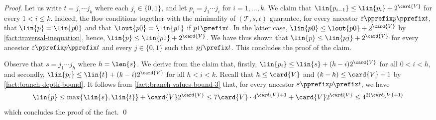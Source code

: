 \FactBranchValuesBoundFour*
\begin{proof}
  Let us write $t = j_1 \cdots j_k$ where each $j_i \in \{0, 1\}$,
  and let $p_i = j_1 \cdots j_i$ for $i = 1, \ldots, k$.
  We claim that
  $\lin{p_{i-1}} \leq \lin{p_i} + 2^{\card{V}}$
  for every $1 < i \leq k$.
  Indeed,
  the flow conditions together with
  the minimality of $(\mathcal{T}, s, t)$ guarantee,
  for every ancestor $\varepsilon \pprefix p \pprefix t$,
  that $\lin{p} = \lin{p0}$ and
  that $\lout{p0} = \lin{p1}$ if $p1 \prefix t$.
  In the latter case,
  $\lin{p0} \leq \lout{p0} + 2^{\card{V}}$
  by \cref{fact:traversal-inequation},
  hence,
  $\lin{p} \leq \lin{p1} + 2^{\card{V}}$.
  We have thus shown that
  $\lin{p} \leq \lin{pj} + 2^{\card{V}}$
  for every ancestor $\varepsilon \pprefix p \pprefix t$
  and every $j \in \{0, 1\}$
  such that $pj \prefix t$.
  This concludes the proof of the claim.

  Observe that $s = j_1 \cdots j_h$ where $h = \len{s}$.
  We derive from the claim that, firstly,
  $\lin{p_i} \leq \lin{s} + (h-i) 2^{\card{V}}$
  for all $0 < i < h$,
  and secondly,
  $\lin{p_i} \leq \lin{t} + (k-i) 2^{\card{V}}$
  for all $h < i < k$.
  Recall that $h \leq \card{V}$ and $(k-h) \leq \card{V} + 1$ by \cref{fact:branch-depth-bound}.
  It follows from \cref{fact:branch-values-bound-3}
  that,
  for every ancestor $\varepsilon \pprefix p \prefix t$,
  we have
  \begin{equation*}
  \lin{p}
  \leq \max\{\lin{s}, \lin{t}\} + \card{V} 2^{\card{V}}
  \leq 7 \card{V} \cdot 4^{\card{V}+1} + \card{V} 2^{\card{V}}
\leq 4^{2(\card{V}+1)}
  \end{equation*}
  which concludes the proof of the fact.
  \qed
\end{proof}
